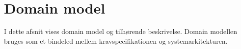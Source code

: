 \section{Domain model}

I dette afsnit vises domain model og tilhørende beskrivelse.
Domain modellen bruges som et bindeled mellem kravspecifikationen og systemarkitekturen.   

